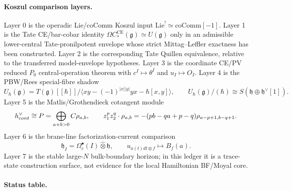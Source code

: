 \paragraph{Koszul comparison layers.}
Layer 0 is the operadic Lie/coComm Koszul input
\(\mathrm{Lie}^{!}\simeq\mathrm{coComm}[-1]\).  Layer 1 is the
Tate CE/bar-cobar identity
\(\Omega C^{\mathrm{CE}}_*(\mathfrak g)\simeq U(\mathfrak g)\) only in an
admissible lower-central Tate-pronilpotent envelope whose strict
Mittag--Leffler exactness has been constructed.  Layer 2 is the
corresponding Tate Quillen equivalence, relative to the transferred
model-envelope hypotheses.  Layer 3 is the coordinate CE/PV reduced \(P_0\)
central-operation theorem with \(c^I\mapsto\theta^I\) and
\(u_I\mapsto O_I\).  Layer 4 is the PBW/Rees special-fibre shadow
\[
  U_\hbar(\mathfrak g)
  =
  T(\mathfrak g)[[\hbar]]/
  \langle xy-(-1)^{|x||y|}yx-\hbar[x,y]\rangle,\qquad
  U_\hbar(\mathfrak g)/(\hbar)\cong
  S(\mathfrak h\oplus\mathfrak h^\vee[1]).
\]
Layer 5 is the Matlis/Grothendieck cotangent module
\[
  h^\vee_{cont}\cong
  P=\bigoplus_{a+b>0}C\rho_{a,b},\qquad
  z_1^pz_2^q\cdot\rho_{a,b}
  =-(pb-qa+p-q)\rho_{a-p+1,b-q+1}.
\]
Layer 6 is the brane-line factorization-current comparison
\[
  \mathfrak h_I=\Omega^\bullet_c(I)\widehat\otimes\mathfrak h,\qquad
  u_{a(t)dt\otimes f}\longmapsto B_f(a).
\]
Layer 7 is the stable large-\(N\) bulk-boundary horizon; in this ledger it
is a trace-state construction surface, not evidence for the local
Hamiltonian BF/Moyal core.

\medskip
\paragraph{Status table.}

